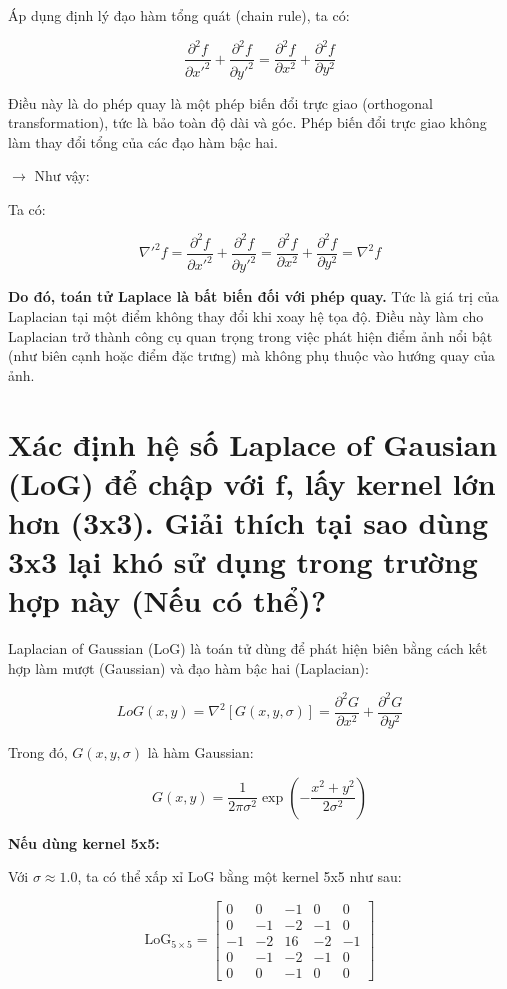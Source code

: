 \documentclass[12pt]{article}
\begin{document}
	Áp dụng định lý đạo hàm tổng quát (chain rule), ta có:
	
	\[
	\frac{\partial^2 f}{\partial x'^2} + \frac{\partial^2 f}{\partial y'^2} = \frac{\partial^2 f}{\partial x^2} + \frac{\partial^2 f}{\partial y^2}
	\]
	
	Điều này là do phép quay là một phép biến đổi trực giao (orthogonal transformation), tức là bảo toàn độ dài và góc. Phép biến đổi trực giao không làm thay đổi tổng của các đạo hàm bậc hai.
	
	$\rightarrow$ Như vậy:
	
	Ta có:
	
	\[
	\nabla'^2 f = \frac{\partial^2 f}{\partial x'^2} + \frac{\partial^2 f}{\partial y'^2} = \frac{\partial^2 f}{\partial x^2} + \frac{\partial^2 f}{\partial y^2} = \nabla^2 f
	\]
	
	\textbf{Do đó, toán tử Laplace là bất biến đối với phép quay.} Tức là giá trị của Laplacian tại một điểm không thay đổi khi xoay hệ tọa độ. Điều này làm cho Laplacian trở thành công cụ quan trọng trong việc phát hiện điểm ảnh nổi bật (như biên cạnh hoặc điểm đặc trưng) mà không phụ thuộc vào hướng quay của ảnh.
	
	\section{Xác định hệ số Laplace of Gausian (LoG) để chập với f, lấy kernel lớn hơn (3x3). Giải thích tại sao dùng 3x3 lại khó sử dụng trong trường hợp này (Nếu có thể)?  }
	
	Laplacian of Gaussian (LoG) là toán tử dùng để phát hiện biên bằng cách kết hợp làm mượt (Gaussian) và đạo hàm bậc hai (Laplacian):
	
	\[
	LoG(x, y) = \nabla^2 \left[ G(x, y, \sigma) \right] = \frac{\partial^2 G}{\partial x^2} + \frac{\partial^2 G}{\partial y^2}
	\]
	
	Trong đó, $G(x, y, \sigma)$ là hàm Gaussian:
	
	\[
	G(x, y) = \frac{1}{2\pi \sigma^2} \exp\left( -\frac{x^2 + y^2}{2\sigma^2} \right)
	\]
	
	\textbf{Nếu dùng kernel 5x5:}
	
	Với $\sigma \approx 1.0$, ta có thể xấp xỉ LoG bằng một kernel 5x5 như sau:
	
	\[
	\text{LoG}_{5 \times 5} =
	\begin{bmatrix}
	0 & 0 & -1 & 0 & 0 \\
	0 & -1 & -2 & -1 & 0 \\
	-1 & -2 & 16 & -2 & -1 \\
	0 & -1 & -2 & -1 & 0 \\
	0 & 0 & -1 & 0 & 0
	\end{bmatrix}
	\]
	
\end{document}
